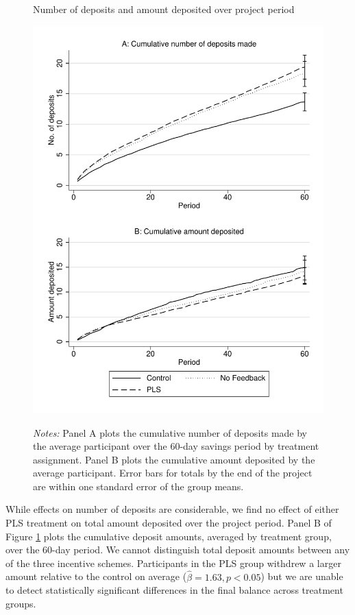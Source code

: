 \documentclass[11pt]{article}
\begin{document}
		\begin{figure}[ht]
			\caption{Number of deposits and amount deposited over project period}
			\includegraphics[height=0.85\textheight]{../../figures/line-cumdeposits.pdf}
			\label{fig:line-cumdeposits}
			\caption*{\footnotesize \emph{Notes:} Panel A plots the cumulative number of deposits made by the average participant over the 60-day savings period by treatment assignment. Panel B plots the cumulative amount deposited by the average participant. Error bars for totals by the end of the project are within one standard error of the group means.}
		\end{figure}

		\clearpage

		While effects on number of deposits are considerable, we find no effect of either PLS treatment on total amount deposited over the project period. Panel B of Figure \ref{fig:line-cumdeposits} plots the cumulative deposit amounts, averaged by treatment group, over the 60-day period. We cannot distinguish total deposit amounts between any of the three incentive schemes. Participants in the PLS group withdrew a larger amount relative to the control on average ($\hat \beta = 1.63, p < 0.05$) but we are unable to detect statistically significant differences in the final balance across treatment groups.
\end{document}
